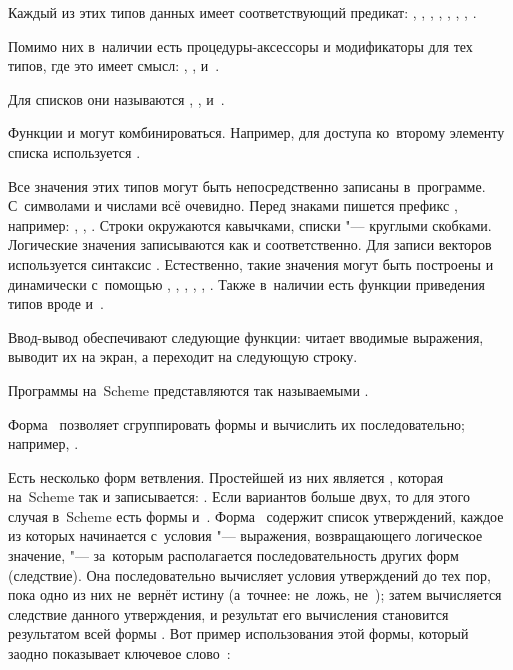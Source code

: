Каждый из этих типов данных имеет соответствующий предикат: ,
, , , , , ,
.

Помимо них в~наличии есть процедуры-аксессоры и модификаторы для тех типов,
где это имеет смысл: , , 
и~.

Для списков они называются , ,  и~.

Функции  и  могут комбинироваться. Например, для доступа
ко~второму элементу списка используется .

Все значения этих типов могут быть непосредственно записаны в~программе.
С~символами и числами всё очевидно. Перед знаками пишется префикс
\ic{\#\bslash}, например: , \ic{\#\bslash +},
. Строки окружаются кавычками, списки "---
\ic{(}круглыми скобками\ic{)}. Логические значения записываются как 
и  соответственно. Для записи векторов используется синтаксис
. Естественно, такие значения могут быть построены и
динамически с~помощью , , , ,
, . Также в~наличии есть функции приведения типов
вроде  и~.

Ввод-вывод обеспечивают следующие функции:  читает вводимые выражения,
 выводит их на экран, а  переходит на следующую строку.

\bigskip

Программы на~Scheme представляются так называемыми .

Форма~ позволяет сгруппировать формы и вычислить их последовательно;
например, .

Есть несколько форм ветвления. Простейшей из них является ,
которая на~Scheme так и записывается: . Если вариантов больше двух, то для этого случая в~Scheme есть
формы  и~. Форма~ содержит список утверждений, каждое
из которых начинается с~условия "--- выражения, возвращающего логическое
значение, "--- за~которым располагается последовательность других форм
(следствие). Она последовательно вычисляет условия утверждений до тех пор,
пока одно из них не~вернёт истину (а~точнее: не~ложь, не~); затем
вычисляется следствие данного утверждения, и результат его вычисления становится
результатом всей формы . Вот пример использования этой формы, который
заодно показывает ключевое слово~:

